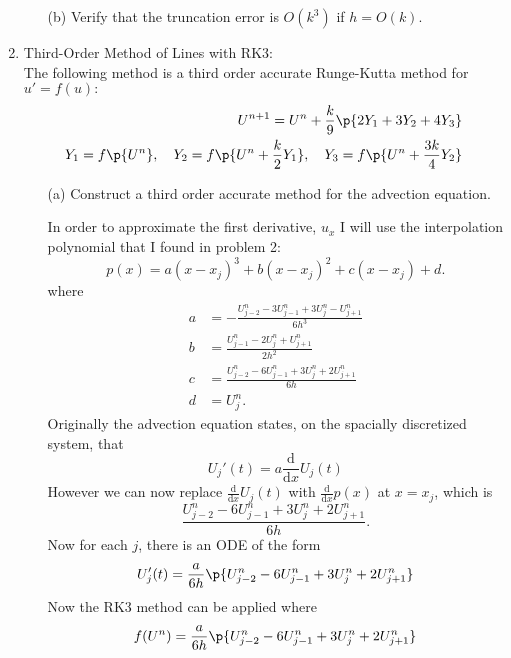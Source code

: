 \documentclass[11pt, oneside, titlepage]{article}
\begin{document}
\begin{enumerate}
\begin{enumerate}
            \item[(b)]
                Verify that the truncation error is $O(k^3)$ if $h = O(k)$.
        \end{enumerate}

    \item %
        Third-Order Method of Lines with RK3: \\
        The following method is a third order accurate Runge-Kutta method for
        $u' = f(u):$
        \begin{align*}
            U^{n+1} = U^n + \frac{k}{9}\p{2Y_1 + 3Y_2 + 4Y_3} \\
            Y_1 = f\p{U^n}, \quad
            Y_2 = f\p{U^n + \frac{k}{2} Y_1}, \quad
            Y_3 = f\p{U^n + \frac{3k}{4} Y_2}
        \end{align*}
        \begin{enumerate}
            \item[(a)]
                Construct a third order accurate method for the advection equation.

                In order to approximate the first derivative, $u_x$ I will use
                the interpolation polynomial that I found in problem 2:
                \[
                    p(x) = a(x - x_j)^3 + b(x - x_j)^2 + c(x - x_j) + d.
                \]
                where
                \begin{align*}
                    a &= -\frac{U_{j-2}^n - 3U_{j-1}^n + 3U_j^n - U_{j+1}^n}{6h^3}\\
                    b &= \frac{U_{j-1}^n - 2U_j^n + U_{j+1}^n}{2h^2}\\
                    c &= \frac{U_{j-2}^n - 6U_{j-1}^n + 3U_j^n + 2U_{j+1}^n}{6h} \\
                    d &= U_j^n.
                \end{align*}
                Originally the advection equation states, on the spacially
                discretized system, that
                \[
                    U_j'(t) = a \frac{\mathrm{d}}{\mathrm{d}x} U_j(t)
                \]
                However we can now replace $\frac{\mathrm{d}}{\mathrm{d}x} U_j(t)$
                with $\frac{\mathrm{d}}{\mathrm{d}x} p(x)$ at $x = x_j$, which is
                \[
                    \frac{U_{j-2}^n - 6U_{j-1}^n + 3U_j^n + 2U_{j+1}^n}{6h}.
                \]
                Now for each $j$, there is an ODE of the form
                \[
                    U_j'(t) = \frac{a}{6h} \p{U_{j-2}^n - 6U_{j-1}^n + 3U_j^n + 2U_{j+1}^n}
                \]
                Now the RK3 method can be applied where
                \[
                    f(U^n) = \frac{a}{6h} \p{U_{j-2}^n - 6U_{j-1}^n + 3U_j^n + 2U_{j+1}^n}
                \]



\end{enumerate}
\end{enumerate}
\end{document}
